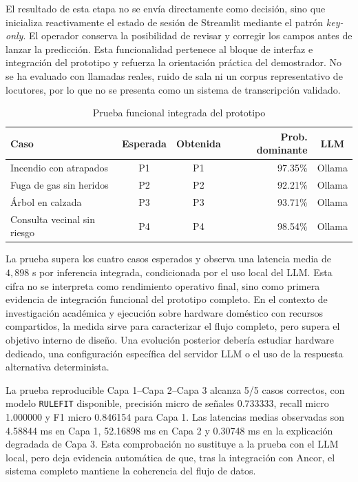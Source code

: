 El resultado de esta etapa no se envía directamente como decisión, sino que inicializa
reactivamente el estado de sesión de Streamlit mediante el patrón \textit{key-only}. El
operador conserva la posibilidad de revisar y corregir los campos antes de lanzar la
predicción. Esta funcionalidad pertenece al bloque de interfaz e integración del
prototipo y refuerza la orientación práctica del demostrador. No se ha evaluado con
llamadas reales, ruido de sala ni un corpus representativo de locutores, por lo que no
se presenta como un sistema de transcripción validado.

\begin{table}[ht]
\centering
\caption{Prueba funcional integrada del prototipo}
\label{tab:8-smoke-prototipo}
\small
\begin{tabular}{|l|c|c|r|c|}
\hline
\textbf{Caso} & \textbf{Esperada} & \textbf{Obtenida} & \textbf{Prob. dominante} & \textbf{LLM} \\ \hline
Incendio con atrapados & P1 & P1 & 97.35\% & Ollama \\ \hline
Fuga de gas sin heridos & P2 & P2 & 92.21\% & Ollama \\ \hline
Árbol en calzada & P3 & P3 & 93.71\% & Ollama \\ \hline
Consulta vecinal sin riesgo & P4 & P4 & 98.54\% & Ollama \\ \hline
\end{tabular}
\end{table}

La prueba supera los cuatro casos esperados y observa una latencia media de
\(4{,}898\) s por inferencia integrada, condicionada por el uso local del LLM. Esta
cifra no se interpreta como rendimiento operativo final, sino como primera evidencia de
integración funcional del prototipo completo. En el contexto de investigación académica
y ejecución sobre hardware doméstico con recursos compartidos, la medida sirve para
caracterizar el flujo completo, pero supera el objetivo interno de diseño. Una evolución
posterior debería estudiar hardware dedicado, una configuración específica del servidor
LLM o el uso de la respuesta alternativa determinista.

La prueba reproducible Capa 1--Capa 2--Capa 3 alcanza 5/5 casos correctos, con
modelo \texttt{RULEFIT} disponible, precisión micro de señales 0.733333, recall micro
1.000000 y F1 micro 0.846154 para Capa 1. Las latencias medias observadas son
4.58844 ms en Capa 1, 52.16898 ms en Capa 2 y 0.30748 ms en la explicación degradada
de Capa 3. Esta comprobación no sustituye a la prueba con el LLM local, pero deja evidencia
automática de que, tras la integración con Ancor, el sistema completo mantiene la
coherencia del flujo de datos.

